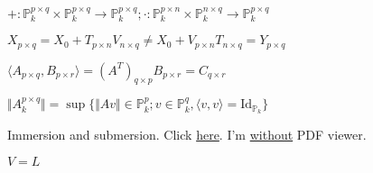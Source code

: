 \documentclass[10pt,a4paper]{article}
\begin{document}
$+ : \mathbb{P}_k^{p \times q} \times \mathbb{P}_k^{p \times q} \rightarrow \mathbb{P}_k^{p \times q} ; \cdot : \mathbb{P}_k^{p \times n} \times \mathbb{P}_k^{n \times q} \rightarrow \mathbb{P}_k^{p \times q}$

$X_{p \times q} = X_0 + T_{p \times n} V_{n \times q} \neq X_0 + V_{p \times n} T_{n \times q} = Y_{p \times q}$

$\langle A_{p \times q}, B_{p \times r} \rangle = (A^T)_{q \times p} B_{p \times r} = C_{q \times r}$

$\Vert A_k^{p \times q} \Vert = \sup \{ \Vert A v \Vert \in \mathbb{P}_k^p ; v \in \mathbb{P}_k^q , \langle v, v \rangle = \text{Id}_{\mathbb{P}_k} \}$

\vspace{3mm}

Immersion and submersion. Click \href{https://sites.google.com/site/mathspirituality2/CardinalityTransformations.pdf?attredirects=0&d=1}{here}. I'm \href{https://docs.google.com/viewer?a=v&pid=sites&srcid=ZGVmYXVsdGRvbWFpbnxtYXRoc3Bpcml0dWFsaXR5MnxneDo3OTE2ZTQ4ZjZiN2ZmM2I4}{without} PDF viewer.

$V = L$
\end{document}
